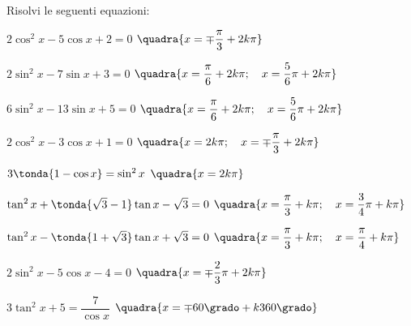 
\begin{esercizio}\label{ese:03.1}
Risolvi le seguenti equazioni:
 \begin{enumeratea}
  \item $2 \cos^2 x - 5 \cos x + 2 = 0$
   \hfill $\quadra{x = \mp \dfrac{\pi}{3} + 2 k \pi}$
  \item $2 \sin^2 x - 7 \sin x + 3 = 0$
   \hfill $\quadra{x = \dfrac{\pi}{6} + 2 k \pi; \quad
                   x = \dfrac{5}{6} \pi + 2 k \pi}$
  \item $6 \sin^2 x - 13 \sin x + 5 = 0$
   \hfill $\quadra{x = \dfrac{\pi}{6} + 2 k \pi; \quad
                   x = \dfrac{5}{6} \pi + 2 k \pi}$
  \item $2 \cos^2 x - 3 \cos x + 1 = 0$
   \hfill $\quadra{x = 2 k \pi; \quad 
                   x = \mp \dfrac{\pi}{3} + 2 k \pi}$
  \item $3 \tonda{1 - \cos x} = \sin^2 x$
   \hfill $\quadra{x = 2 k \pi}$
  \item $\tan^2 x + \tonda{\sqrt{3} - 1} \tan x - \sqrt{3} = 0$
   \hfill $\quadra{x = \dfrac{\pi}{3} + k \pi; \quad
                   x = \dfrac{3}{4} \pi + k \pi}$
  \item $\tan^2 x - \tonda{1 + \sqrt{3}} \tan x + \sqrt{3} = 0$
   \hfill $\quadra{x = \dfrac{\pi}{3} + k \pi; \quad
                   x = \dfrac{\pi}{4} + k \pi}$
  \item $2 \sin^2 x - 5 \cos x -4 = 0$
   \hfill $\quadra{x = \mp \dfrac{2}{3} \pi + 2 k \pi}$
  \item $3 \tan^2 x + 5 = \dfrac{7}{\cos x}$
   \hfill $\quadra{x = \mp 60 \grado + k 360 \grado}$
 \end{enumeratea}
\end{esercizio}

\subsubsection*{}

